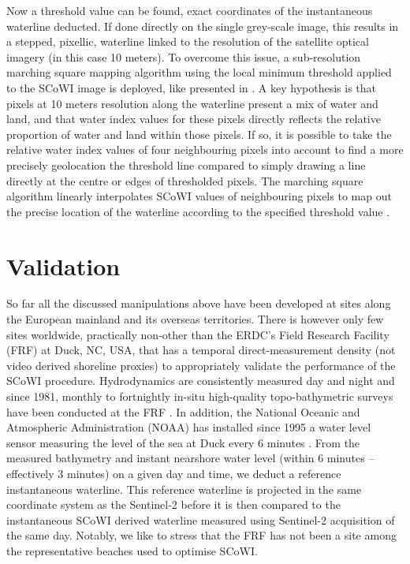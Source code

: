 \documentclass[remotesensing,article,submit,pdftex,moreauthors]{Definitions/mdpi}
\begin{document}
Now a threshold value can be found, exact coordinates of the instantaneous waterline deducted. If done directly on the single grey-scale image, this results in a stepped, pixellic, waterline linked to the resolution of the satellite optical imagery (in this case 10 meters). To overcome this issue, a sub-resolution marching square mapping algorithm using the local minimum threshold applied to the SCoWI image is deployed, like presented in \citet{VOS2019_sub}. A key hypothesis is that pixels at 10 meters resolution along the waterline present a mix of water and land, and that water index values for these pixels directly reflects the relative proportion of water and land within those pixels. If so, it is possible to take the relative water index values of four neighbouring pixels into account to find a more precisely geolocation the threshold line compared to simply drawing a line directly at the centre or edges of thresholded pixels. The marching square algorithm linearly interpolates SCoWI values of neighbouring pixels to map out the precise location of the waterline according to the specified threshold value \citep{CIPOLLETTI201287}.

\section{Validation}
So far all the discussed manipulations above have been developed at sites along the European mainland and its overseas territories. There is however only few sites worldwide, practically non-other than the ERDC's Field Research Facility (FRF) at Duck, NC, USA, that has a temporal direct-measurement density (not video derived shoreline proxies) to appropriately validate the performance of the SCoWI procedure. Hydrodynamics are consistently measured day and night and since 1981, monthly to fortnightly in-situ high-quality topo-bathymetric surveys have been conducted at the FRF \citep{FORTE2017}. In addition, the National Oceanic and Atmospheric Administration (NOAA) has installed since 1995 a water level sensor measuring the level of the sea at Duck every 6 minutes \citep{park2014water}. From the measured bathymetry and instant nearshore water level (within 6 minutes -- effectively 3 minutes) on a given day and time, we deduct a reference instantaneous waterline. This reference waterline is projected in the same coordinate system as the Sentinel-2 before it is then compared to the instantaneous SCoWI derived waterline measured using Sentinel-2 acquisition of the same day. Notably, we like to stress that the FRF has not been a site among the representative beaches used to optimise SCoWI.
\end{document}
